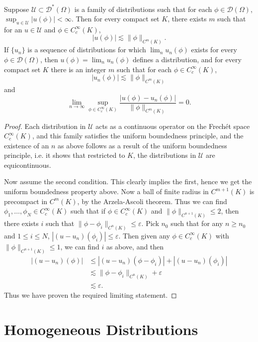 \begin{theorem}
    Suppose $\mathcal{U} \subset \mathcal{D}^*(\Omega)$ is a family of distributions such that for each $\phi \in \mathcal{D}(\Omega)$, $\sup_{u \in \mathcal{U}} |u(\phi)| < \infty$. Then for every compact set $K$, there exists $m$ such that for an $u \in \mathcal{U}$ and $\phi \in C_c^\infty(K)$,
    \[ |u(\phi)| \lesssim \| \phi \|_{C^m(K)}. \]
    If $\{ u_n \}$ is a sequence of distributions for which $\lim_n u_n(\phi)$ exists for every $\phi \in \mathcal{D}(\Omega)$, then $u(\phi) = \lim_n u_n(\phi)$ defines a distribution, and for every compact set $K$ there is an integer $m$ such that for each $\phi \in C_c^\infty(K)$,
    \[ |u_n(\phi)| \lesssim \| \phi \|_{C^m(K)} \]
    and
    \[ \lim_{n \to \infty} \sup_{\phi \in C_c^\infty(K)} \frac{|u(\phi) - u_n(\phi)|}{\| \phi \|_{C^m(K)}} = 0. \]
\end{theorem}
\begin{proof}
    Each distribution in $\mathcal{U}$ acts as a continuous operator on the Frech\'{e}t space $C_c^\infty(K)$, and this family satisfies the uniform boundedness principle, and the existence of an $n$ as above follows as a result of the uniform boundedness principle, i.e. it shows that restricted to $K$, the distributions in $\mathcal{U}$ are equicontinuous.

    Now assume the second condition. This clearly implies the first, hence we get the uniform boundedness property above. Now a ball of finite radius in $C^{m+1}(K)$ is precompact in $C^m(K)$, by the Arzela-Ascoli theorem. Thus we can find $\phi_1,\dots,\phi_N \in C_c^\infty(K)$ such that if $\phi \in C_c^\infty(K)$ and $\| \phi \|_{C^{n+1}(K)} \leq 2$, then there exists $i$ such that $\| \phi - \phi_i \|_{C^n(K)} \leq \varepsilon$. Pick $n_0$ such that for any $n \geq n_0$ and $1 \leq i \leq N$, $|(u - u_n)(\phi_i)| \leq \varepsilon$. Then given any $\phi \in C_c^\infty(K)$ with $\| \phi \|_{C^{n+1}(K)} \leq 1$, we can find $i$ as above, and then
    \begin{align*}
        |(u - u_n)(\phi)| &\leq |(u - u_n)(\phi - \phi_i)| + |(u - u_n)(\phi_i)|\\
        &\lesssim \| \phi - \phi_i \|_{C^n(K)} + \varepsilon\\
        &\lesssim \varepsilon.
    \end{align*}
    Thus we have proven the required limiting statement.
\end{proof}

\section{Homogeneous Distributions}

